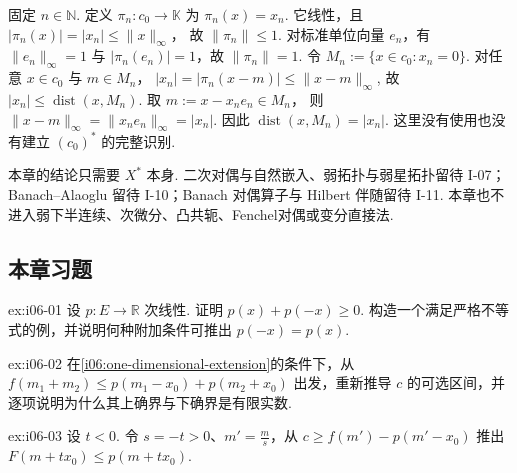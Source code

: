 \begin{FAApplication}[坐标约束的距离]\label{i06:ex-c0-distance}
固定 \(\displaystyle n\in\mathbb N\). 定义 \(\displaystyle \pi_n:c_0\to\mathbb K\) 为 \(\displaystyle \pi_n(x)=x_n\). 它线性，且 \(\displaystyle |\pi_n(x)|=|x_n|\leqslant\|x\|_\infty\)，
故 \(\displaystyle \|\pi_n\|\leqslant1\). 对标准单位向量 \(\displaystyle e_n\)，有 \(\displaystyle \|e_n\|_\infty=1\) 与 \(\displaystyle |\pi_n(e_n)|=1\)，故 \(\displaystyle \|\pi_n\|=1\).
令 \(\displaystyle M_n:=\{x\in c_0:x_n=0\}\).
对任意 \(\displaystyle x\in c_0\) 与 \(\displaystyle m\in M_n\)， \(\displaystyle |x_n| =|\pi_n(x-m)| \leqslant\|x-m\|_\infty\),
故 \(\displaystyle |x_n|\leqslant\operatorname{dist}(x,M_n)\). 取 \(\displaystyle m:=x-x_ne_n\in M_n\)，
则 \(\displaystyle \|x-m\|_\infty =\|x_ne_n\|_\infty =|x_n|\).
因此 \(\displaystyle \operatorname{dist}(x,M_n)=|x_n|\).
这里没有使用也没有建立 \(\displaystyle (c_0)^*\) 的完整识别.
\end{FAApplication}

\begin{FARemark}[后续边界]
本章的结论只需要 \(\displaystyle X^*\) 本身. 二次对偶与自然嵌入、弱拓扑与弱星拓扑留待 I-07；Banach--Alaoglu 留待 I-10；Banach 对偶算子与 Hilbert 伴随留待 I-11. 本章也不进入弱下半连续、次微分、凸共轭、Fenchel对偶或变分直接法.
\end{FARemark}

\subsection{本章习题}\label{sec:i06-exercises}

\begin{FAExercise}[次线性与非对称性]{ex:i06-01}
设 \(\displaystyle p:E\to\mathbb R\) 次线性. 证明 \(\displaystyle p(x)+p(-x)\geqslant0\). 构造一个满足严格不等式的例，并说明何种附加条件可推出 \(\displaystyle p(-x)=p(x)\).
\end{FAExercise}

\begin{FAExercise}[一维延拓区间]{ex:i06-02}
在\autoref{i06:one-dimensional-extension}的条件下，从 \(\displaystyle f(m_1+m_2)\leqslant p(m_1-x_0)+p(m_2+x_0)\) 出发，重新推导 \(\displaystyle c\) 的可选区间，并逐项说明为什么其上确界与下确界是有限实数.
\end{FAExercise}

\begin{FAExercise}[负参数分支]{ex:i06-03}
设 \(\displaystyle t<0\). 令 \(\displaystyle s=-t>0\)、\(\displaystyle m'=\frac{m}{s}\)，从 \(\displaystyle c\geqslant f(m')-p(m'-x_0)\) 推出 \(\displaystyle F(m+t x_0)\leqslant p(m+t x_0)\).
\end{FAExercise}

